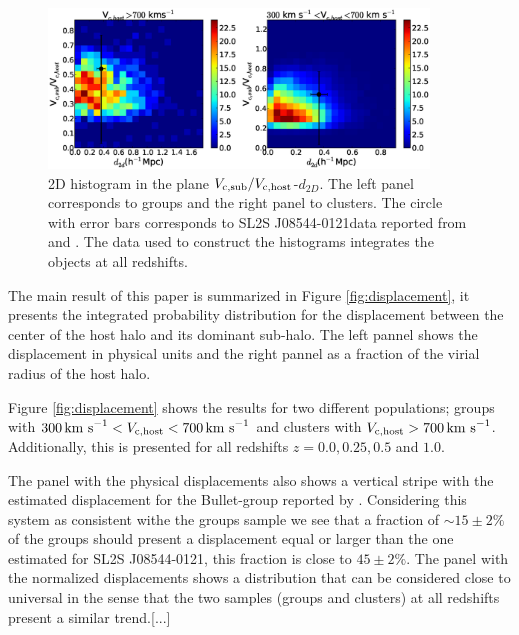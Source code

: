 \documentclass{emulateapj}
\newcommand{\kms}{{\ifmmode{{\mathrm{\,km\ s}^{-1}}}\else{\,km~s$^{-1}$}\fi}}
\newcommand{\bullg}{SL2S J08544-0121}
\begin{document}
\begin{figure}
\begin{center}
\includegraphics[width=0.9\textwidth]{Figures_eps/figure_5.eps} 
\end{center}
\caption{2D histogram in the plane $V_{\rm c,sub}/V_{\rm
    c,host}$-$d_{2D}$. The left panel corresponds to groups and the
  right panel to clusters. The circle with error bars corresponds to
  \bullg data reported from \citet{2013A&A...552A..80M} and
  \citet{Gastaldello}. The data used to construct the histograms
  integrates the objects at all redshifts. }
\label{fig:mass_displacement}
\end{figure}




The main result of this paper is summarized in Figure
\ref{fig:displacement}, it presents the integrated
probability distribution for the displacement between the center of
the host halo and its dominant sub-halo. The left pannel shows
the displacement in physical units and the right pannel as a fraction
of the virial radius of the host halo. 

Figure \ref{fig:displacement} shows the results for two different
populations; groups with $300\kms < V_{\rm c, host}<700\kms$ and
clusters with $V_{\rm c,host}>700\kms$. Additionally, this is
presented for all redshifts $z=0.0, 0.25, 0.5$ and $1.0$. 

The panel with the physical displacements also shows a vertical stripe
with the estimated displacement for the Bullet-group reported by
\cite{Gastaldello}. Considering this system as consistent withe the
groups sample we see that a fraction of $\sim 15\pm 2\%$ of the groups
should present a displacement equal or larger than the one estimated
for \bullg, this fraction is close to $45\pm2\% $. The panel with the
normalized displacements shows a  distribution that can be considered
close to universal in the sense that the two samples (groups and
clusters) at all redshifts present a similar trend.[...]
\end{document}
